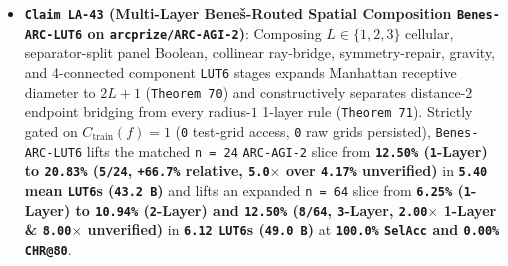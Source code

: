 \documentclass[10pt]{article}
\begin{document}
\begin{itemize}
  \item \textbf{\texttt{Claim LA-43} (Multi-Layer Bene\v{s}-Routed Spatial Composition \texttt{Benes-ARC-LUT6} on \texttt{arcprize/ARC-AGI-2})}: Composing $L \in \{1, 2, 3\}$ cellular, separator-split panel Boolean, collinear ray-bridge, symmetry-repair, gravity, and 4-connected component \texttt{LUT6} stages expands Manhattan receptive diameter to $2L+1$ (\texttt{Theorem 70}) and constructively separates distance-$2$ endpoint bridging from every radius-$1$ 1-layer rule (\texttt{Theorem 71}). Strictly gated on $C_{\text{train}}(f)=1$ (\texttt{0} test-grid access, \texttt{0} raw grids persisted), \texttt{Benes-ARC-LUT6} lifts the matched \texttt{n = 24} \texttt{ARC-AGI-2} slice from \textbf{\texttt{12.50\%} (\texttt{1}-Layer) to \texttt{20.83\%} (\texttt{5/24}, \texttt{+66.7\%} relative, \texttt{5.0$\times$} over \texttt{4.17\%} unverified)} in \textbf{\texttt{5.40} mean \texttt{LUT6}s (\texttt{43.2 B})} and lifts an expanded \texttt{n = 64} slice from \textbf{\texttt{6.25\%} (\texttt{1}-Layer) to \texttt{10.94\%} (\texttt{2}-Layer) and \texttt{12.50\%} (\texttt{8/64}, \texttt{3}-Layer, \texttt{2.00$\times$} 1-Layer \& \texttt{8.00$\times$} unverified)} in \textbf{\texttt{6.12} \texttt{LUT6}s (\texttt{49.0 B})} at \textbf{\texttt{100.0\%} \texttt{SelAcc} and \texttt{0.00\%} \texttt{CHR@80}}.

\end{itemize}
\end{document}
